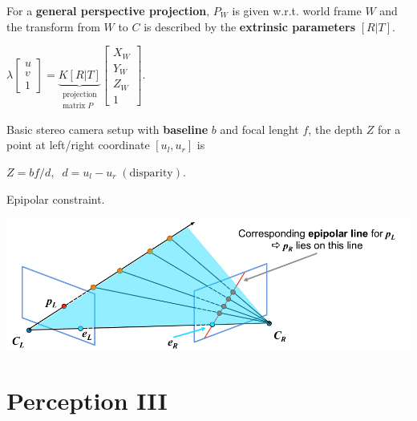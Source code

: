\documentclass[landscape]{article}
\newcommand{\vmspace}{\vspace{-7pt}}
\newcommand{\vpspace}{\vspace{5pt}}
\begin{document}
\begin{multicols}{3}
\begin{minipage}{\columnwidth}
  For a \textbf{general perspective projection}, $P_W$ is given w.r.t. world
  frame $W$ and the transform from $W$ to $C$ is described by the
  \textbf{extrinsic parameters} $[R|T]$.
  \vmspace
  \begin{center}
    $
    \lambda
    \left[\begin{matrix}
      u \\
      v \\
      1
    \end{matrix}\right]
    =
    \underbrace{
    K[R|T]
    }_{\substack{\text{projection} \\ \text{matrix}\;P}}
    \left[\begin{matrix}
      X_W \\
      Y_W \\
      Z_W \\
      1
    \end{matrix}\right].
    $
  \end{center}
\end{minipage}

\vpspace

\begin{minipage}{\columnwidth}
  Basic stereo camera setup with \textbf{baseline} $b$ and focal lenght $f$, the
  depth $Z$ for a point at left/right coordinate $[u_l,u_r]$ is
  \vmspace
  \begin{center}
    $Z = bf/d,\;\;
    d = u_l - u_r\;(\text{disparity}).$
  \end{center}
\end{minipage}

\vpspace

\begin{minipage}{\columnwidth}
  Epipolar constraint.
  \vmspace
  \begin{center}
    \includegraphics[width=0.9\columnwidth]{img/5_EpipolarConstraint.png}
  \end{center}
\end{minipage}

\section{Perception III}


\end{multicols}
\end{document}
